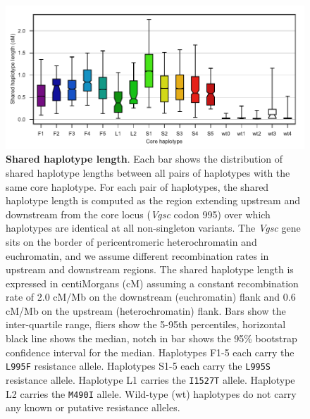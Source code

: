\documentclass[a4paper,11pt,abstracton,hidelinks]{scrartcl}
\begin{document}
%
\begin{figure}[!b]
  \includegraphics[width=1.1\linewidth,center]{artwork/clusters_compare_pspd.pdf}
  \caption{\textbf{Shared haplotype length}. Each bar shows the distribution of shared haplotype lengths between all pairs of haplotypes with the same core haplotype. For each pair of haplotypes, the shared haplotype length is computed as the region extending upstream and downstream from the core locus (\textit{Vgsc} codon 995) over which haplotypes are identical at all non-singleton variants. The \textit{Vgsc} gene sits on the border of pericentromeric heterochromatin and euchromatin, and we assume different recombination rates in upstream and downstream regions. The shared haplotype length is expressed in centiMorgans (cM) assuming a constant recombination rate of 2.0 cM/Mb on the downstream (euchromatin) flank and 0.6 cM/Mb on the upstream (heterochromatin) flank. Bars show the inter-quartile range, fliers show the 5-95th percentiles, horizontal black line shows the median, notch in bar shows the 95\% bootstrap confidence interval for the median. Haplotypes F1-5 each carry the \texttt{L995F} resistance allele. Haplotypes S1-5 each carry the \texttt{L995S} resistance allele. Haplotype L1 carries the \texttt{I1527T} allele. Haplotype L2 carries the \texttt{M490I} allele. Wild-type (wt) haplotypes do not carry any known or putative resistance alleles.}
  \label{fig:pspd}
\end{figure}
\end{document}
